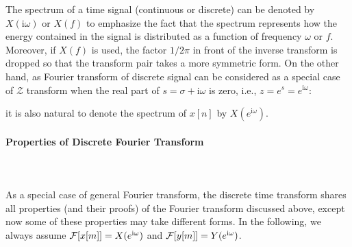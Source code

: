 	\begin{tcolorbox}[title=Remark,arc=10pt,breakable,drop lifted shadow,
  skin=enhanced,
  skin first is subskin of={enhancedfirst}{arc=10pt,no shadow},
  skin middle is subskin of={enhancedmiddle}{arc=10pt,no shadow},
  skin last is subskin of={enhancedlast}{drop lifted shadow}]
	The spectrum of a time signal (continuous or discrete) can be denoted by $X(\mathrm{i}\omega)$ or $X(f)$ to emphasize the fact that the spectrum represents how the energy contained in the signal is distributed as a function of frequency $\omega$ or $f$. Moreover, if $X(f)$ is used, the factor $1/2\pi$ in front of the inverse transform is dropped so that the transform pair takes a more symmetric form. On the other hand, as Fourier transform of discrete signal can be considered as a special case of $\mathcal{Z}$ transform when the real part of $s=\sigma+\mathrm{i}\omega$ is zero, i.e., $z=e^s=e^{\mathrm{i}\omega}$:
	
	it is also natural to denote the spectrum of $x[n]$ by $X(e^{\mathrm{i}\omega})$.
	\end{tcolorbox}
	
	
	\paragraph{Properties of Discrete Fourier Transform}\mbox{}\\\\
	As a special case of general Fourier transform, the discrete time transform shares all properties (and their proofs) of the Fourier transform discussed above, except now some of these properties may take different forms. In the following, we always assume ${\cal F}[x[m]]=X(e^{\mathrm{i}\omega})$ and ${\cal F}[y[m]]=Y(e^{\mathrm{i}\omega})$. 
	
